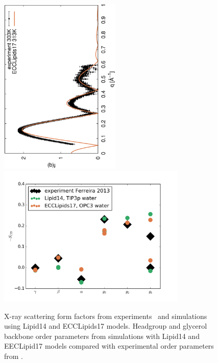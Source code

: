 \documentclass[aip,jcp,twocolumn]{revtex4}
\begin{document}
\begin{figure}[]
  \centering
  \includegraphics[height=8.5cm,angle=-90]{../Fig/form-f_exp-l14-eccl17.eps}
%
  \includegraphics[width=9.0cm]{../Fig/ipython_nb/Headgr_OPs_exp-L14-ECCL17.png}
  \caption{\label{simVSexpNOions}
    X-ray scattering form factors from experiments~\cite{Kucerka2011} and simulations using Lipid14 and ECCLipids17 models. 
    Headgroup and glycerol backbone order parameters from simulations with Lipid14 \cite{dickson14} and EECLipid17 models
    compared with experimental order parameters from \cite{ferreira13}.}
\end{figure}
\end{document}

